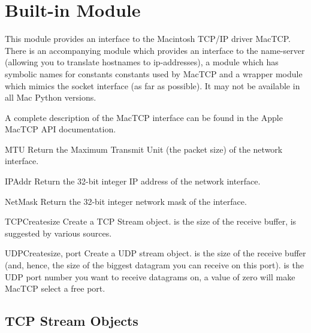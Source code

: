 \section{Built-in Module }

\renewcommand{\indexsubitem}{(in module mactcp)}

This module provides an interface to the Macintosh TCP/IP driver
MacTCP\@. There is an accompanying module  which provides an
interface to the name-server (allowing you to translate hostnames to
ip-addresses), a module  which has symbolic names for
constants constants used by MacTCP and a wrapper module 
which mimics the \UNIX{} socket interface (as far as possible).  It may
not be available in all Mac Python versions.

A complete description of the MacTCP interface can be found in the
Apple MacTCP API documentation.

\begin{funcdesc}{MTU}{}
Return the Maximum Transmit Unit (the packet size) of the network
interface.
\end{funcdesc}

\begin{funcdesc}{IPAddr}{}
Return the 32-bit integer IP address of the network interface.
\end{funcdesc}

\begin{funcdesc}{NetMask}{}
Return the 32-bit integer network mask of the interface.
\end{funcdesc}

\begin{funcdesc}{TCPCreate}{size}
Create a TCP Stream object.  is the size of the receive
buffer,  is suggested by various sources.
\end{funcdesc}

\begin{funcdesc}{UDPCreate}{size, port}
Create a UDP stream object.  is the size of the receive
buffer (and, hence, the size of the biggest datagram you can receive
on this port).  is the UDP port number you want to receive
datagrams on, a value of zero will make MacTCP select a free port.
\end{funcdesc}

\subsection{TCP Stream Objects}

